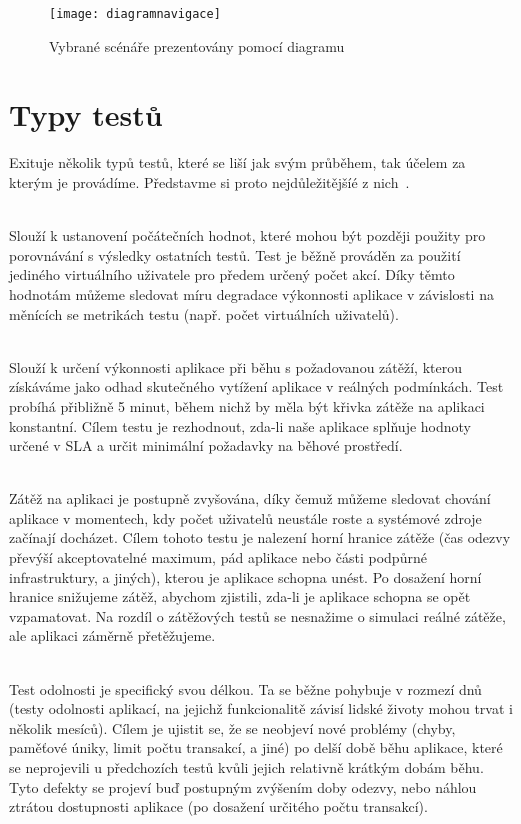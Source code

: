 \documentclass[122pt,oneside]{fithesis}
\begin{document}
\begin{figure}[!ht]
\centering
\texttt{[image: diagramnavigace]}
\caption{Vybrané scénáře prezentovány pomocí diagramu}
\label{fig:diagramNavigace}
\end{figure}

\section{Typy testů}
Exituje několik typů testů, které se liší jak svým průběhem, tak účelem za kterým je provádíme. Představme si proto nejdůležitějšíé z nich~\cite{loadTest}.

\vspace{5 mm}
\\\indent Slouží k ustanovení počátečních hodnot, které mohou být později použity pro porovnávání s výsledky ostatních testů. Test je běžně prováděn za použití jediného virtuálního uživatele pro předem určený počet akcí. Díky těmto hodnotám můžeme sledovat míru degradace výkonnosti aplikace v závislosti na měnících se metrikách testu (např. počet virtuálních uživatelů).

\vspace{5 mm}
\\\indent Slouží k určení výkonnosti aplikace při běhu s požadovanou zátěží, kterou získáváme jako odhad skutečného vytížení aplikace v reálných podmínkách. Test probíhá přibližně 5 minut, během nichž by měla být křivka zátěže na aplikaci konstantní. Cílem testu je rezhodnout, zda-li naše aplikace splňuje hodnoty určené v SLA a určit minimální požadavky na běhové prostředí.

\vspace{5 mm}
\\\indent Zátěž na aplikaci je postupně zvyšována, díky čemuž můžeme sledovat chování aplikace v momentech, kdy počet uživatelů neustále roste a systémové zdroje začínají docházet. Cílem tohoto testu je nalezení horní hranice zátěže (čas odezvy převýší akceptovatelné maximum, pád aplikace nebo části podpůrné infrastruktury, a jiných), kterou je aplikace schopna unést. Po dosažení horní hranice snižujeme zátěž, abychom zjistili, zda-li je aplikace schopna se opět vzpamatovat. Na rozdíl o zátěžových testů se nesnažime o simulaci reálné zátěže, ale aplikaci záměrně přetěžujeme.

\vspace{5 mm}
\\\indent Test odolnosti je specifický svou délkou. Ta se běžne pohybuje v rozmezí dnů (testy odolnosti aplikací, na jejichž funkcionalitě závisí lidské životy mohou trvat i několik mesíců). Cílem je ujistit se, že se neobjeví nové problémy (chyby, paměťové úniky, limit počtu transakcí, a jiné) po delší době běhu aplikace, které se neprojevili u předchozích testů kvůli jejich relativně krátkým dobám běhu. Tyto defekty se projeví buď postupným zvýšením doby odezvy, nebo náhlou ztrátou dostupnosti aplikace (po dosažení určitého počtu transakcí).
\end{document}
